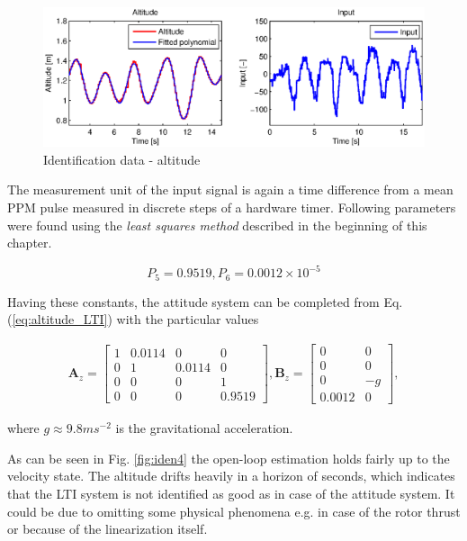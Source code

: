 \begin{figure}[h]
\includegraphics[width=1\textwidth]{fig/iden3.eps} 
\caption{Identification data - altitude}
\label{fig:iden3}
\end{figure}

The measurement unit of the input signal is again a time difference from a mean PPM pulse measured in discrete steps of a hardware timer. Following parameters were found using the \emph{least squares method} described in the beginning of this chapter. 

\begin{equation}
P_5 = 0.9519, P_6 = 0.0012 \times 10^{-5} 
\label{eq:constants1}
\end{equation}

Having these constants, the attitude system can be completed from Eq. (\ref{eq:altitude_LTI}) with the particular values

\begin{equation}
\begin{split}
\mathbf{A}_{z} = \begin{bmatrix}
1 & 0.0114 & 0 & 0\\
0 & 1 & 0.0114 & 0\\
0 & 0 & 0 & 1 \\
0 & 0 & 0 & 0.9519
\end{bmatrix}, \mathbf{B}_{z} = \begin{bmatrix}
0 & 0\\
0 & 0\\
0 & -g\\
0.0012 & 0
\end{bmatrix},
\end{split}
\label{eq:altitude_LTI_with_constants}
\end{equation}

where $g \approx 9.8 ms^{-2}$ is the gravitational acceleration.

As can be seen in Fig. \ref{fig:iden4} the open-loop estimation holds fairly up to the velocity state. The altitude drifts heavily in a horizon of seconds, which indicates that the LTI system is not identified as good as in case of the attitude system. It could be due to omitting some physical phenomena e.g. in case of the rotor thrust or because of the linearization itself.

